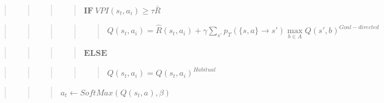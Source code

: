 \documentclass[10pt,a4paper,onecolumn]{article}
\begin{document}
\begin{quote}
\begin{quote}
\begin{quote}
\begin{quote}
\(\textbf{IF}\ VPI(s_t, a_i) \geq \tau \bar{R}\)
\end{quote}
\end{quote}
\end{quote}
\end{quote}

\begin{quote}
\begin{quote}
\begin{quote}
\begin{quote}
\begin{quote}
\(Q(s_t,a_i) = \hat{R}(s_t,a_i) + \gamma \sum\limits_{s'}p_{T}(\{s,a\}\rightarrow s') \max\limits_{b \in A} Q(s',b)^{Goal-directed}\)
\end{quote}
\end{quote}
\end{quote}
\end{quote}
\end{quote}

\begin{quote}
\begin{quote}
\begin{quote}
\begin{quote}
\(\textbf{ELSE}\)
\end{quote}
\end{quote}
\end{quote}
\end{quote}

\begin{quote}
\begin{quote}
\begin{quote}
\begin{quote}
\begin{quote}
\(Q(s_t,a_i) = Q(s_t,a_i)^{Habitual}\)
\end{quote}
\end{quote}
\end{quote}
\end{quote}
\end{quote}

\begin{quote}
\begin{quote}
\begin{quote}
\(a_t \leftarrow \textit{SoftMax}(Q(s_t,a), \beta)\)
\end{quote}
\end{quote}
\end{quote}
\end{document}
